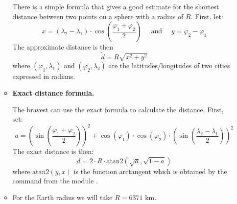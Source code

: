 \documentclass[11pt,class=report,crop=false]{standalone}
\begin{document}
\begin{activite}
\begin{enumerate}
\begin{itemize}
	There is a simple formula that gives a good estimate for the shortest distance between two points on a sphere with a radius of $R$.
    First, let:
    $$x =   (\lambda_2-\lambda_1)\cdot  \cos\left( \frac{\varphi_1+\varphi_2}{2} \right)
    \quad\text{ and }\quad 
    y = \varphi_2-\varphi_1$$
	The approximate distance is then 
	$$ \tilde d = R \sqrt{x^2 + y^2}$$		
	where $(\varphi_1,\lambda_1)$ and $(\varphi_2,\lambda_2)$ are the latitudes/longitudes of two cities expressed in radians.
	
	\item \textbf{Exact distance formula.}
	
	The bravest can use the exact formula to calculate the distance.
	First, set: 
	$$a = \left(\sin\left(\frac{\varphi_1+\varphi_2}{2}\right)\right)^2 + \cos(\varphi_1)\cdot \cos(\varphi_2) \cdot \left(\sin\left( \frac{\lambda_2-\lambda_1}{2} \right)\right)^2$$
    The exact distance is then:
    $$d = 2 \cdot R \cdot \text{atan2}\left(\sqrt{a},\sqrt{1-a}\right)$$
    where $\text{atan2}(y,x)$ is the function \og{}arctangent\fg{} which is obtained by the command  from the module .	
	
	\item For the Earth radius we will take $R = 6371$ km.

\end{itemize}
  
\end{enumerate}   
     
\end{activite}
\end{document}
